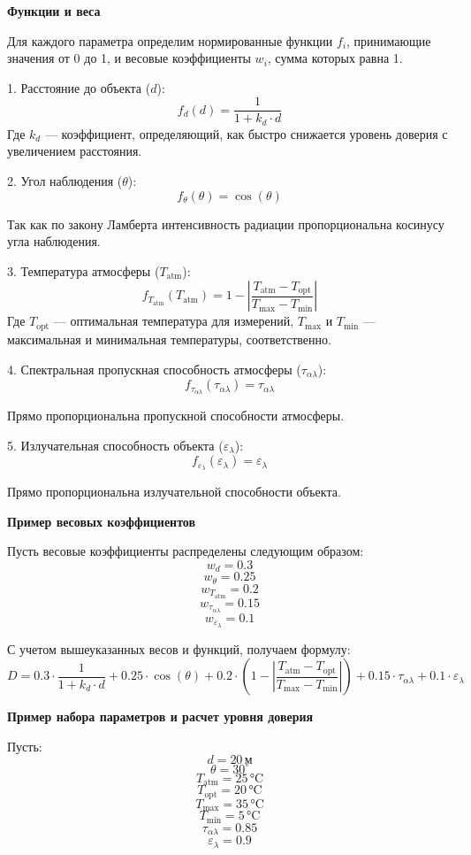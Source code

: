 \textbf{Функции и веса}

Для каждого параметра определим нормированные функции \(f_i\), принимающие значения от 0 до 1, и весовые коэффициенты \(w_i\), сумма которых равна 1.

1. Расстояние до объекта (\(d\)):
   \[ f_d(d) = \frac{1}{1 + k_d \cdot d} \]
   Где \(k_d\) — коэффициент, определяющий, как быстро снижается уровень доверия с увеличением расстояния.

2. Угол наблюдения (\(\theta\)):
   \[ f_\theta(\theta) = \cos(\theta) \]
   
   Так как по закону Ламберта интенсивность радиации пропорциональна косинусу угла наблюдения.

3. Температура атмосферы (\(T_{\text{atm}}\)):
   \[ f_{T_{\text{atm}}}(T_{\text{atm}}) = 1 - \left| \frac{T_{\text{atm}} - T_{\text{opt}}}{T_{\text{max}} - T_{\text{min}}} \right| \]
   Где \(T_{\text{opt}}\) — оптимальная температура для измерений, \(T_{\text{max}}\) и \(T_{\text{min}}\) — максимальная и минимальная температуры, соответственно.

4. Спектральная пропускная способность атмосферы (\(\tau_{\alpha \lambda}\)):
   \[ f_{\tau_{\alpha \lambda}}(\tau_{\alpha \lambda}) = \tau_{\alpha \lambda} \]
   
   Прямо пропорциональна пропускной способности атмосферы.

5. Излучательная способность объекта (\(\varepsilon_\lambda\)):
   \[ f_{\varepsilon_\lambda}(\varepsilon_\lambda) = \varepsilon_\lambda \]
   
   Прямо пропорциональна излучательной способности объекта.


\textbf{Пример весовых коэффициентов}

Пусть весовые коэффициенты распределены следующим образом:
\[w_d = 0.3\] 
\[w_\theta = 0.25\]
\[w_{T_{\text{atm}}} = 0.2\]
\[w_{\tau_{\alpha \lambda}} = 0.15\]
\[w_{\varepsilon_\lambda} = 0.1\]

С учетом вышеуказанных весов и функций, получаем формулу:
\[ D = 0.3 \cdot \frac{1}{1 + k_d \cdot d} + 0.25 \cdot \cos(\theta) + 0.2 \cdot \left(1 - \left| \frac{T_{\text{atm}} - T_{\text{opt}}}{T_{\text{max}} - T_{\text{min}}} \right| \right) + 0.15 \cdot \tau_{\alpha \lambda} + 0.1 \cdot \varepsilon_\lambda \]


\textbf{Пример набора параметров и расчет уровня доверия}

Пусть:
\[d = 20 \, \text{м}\]
\[\theta = 30^\circ\]
\[T_{\text{atm}} = 25 \, \text{°C}\] 
\[T_{\text{opt}} = 20 \, \text{°C}\]
\[T_{\text{max}} = 35 \, \text{°C}\] 
\[T_{\text{min}} = 5 \, \text{°C}\]
\[\tau_{\alpha \lambda} = 0.85\]
\[\varepsilon_\lambda = 0.9\]

